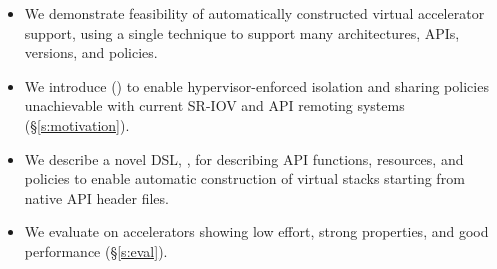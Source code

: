 \begin{itemize}[nosep,leftmargin=1em,labelwidth=*,align=left]
\item We demonstrate feasibility of automatically constructed virtual accelerator support, using a single technique to support many architectures, APIs, versions, and policies.
\item We introduce \noveltechnique (\novtechabbrv) to enable
hypervisor-enforced isolation and sharing policies unachievable with current
SR-IOV and API remoting systems (\S\ref{s:motivation}).
\item We describe a novel DSL, \speclang, for describing API functions, resources, and policies to enable automatic construction of virtual stacks starting from native API header files.
\item We evaluate \model on \numaccelerators accelerators showing low effort, strong properties, and good performance (\S\ref{s:eval}).
\end{itemize}
